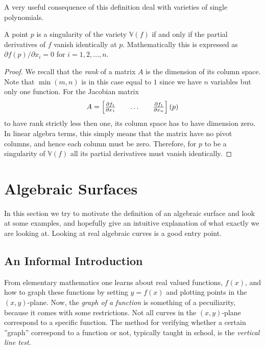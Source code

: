 \documentclass{article}
\newcommand{\V}{\mathbb{V}}
\begin{document}
A very useful consequence of this definition deal with varieties of single
polynomials.
\begin{corollary}
    \label{crl:single_poly}
    A point $p$ is a singularity of the variety $\V(f)$ if and only if the
    partial derivatives of $f$ vanish identically at $p$. Mathematically this
    is expressed as ${\partial f(p)}/{\partial x_i} = 0$ for $i = 1, 2, \ldots,
    n$.
\end{corollary}
\begin{proof}
    We recall that the \emph{rank} of a matrix $A$ is the dimension of its
    column space. Note that $\min(m, n)$ is in this case equal to $1$ since we
    have $n$ variables but only one function.
    For the Jacobian matrix
    \begin{equation}
        \notag
        A = \begin{bmatrix}
            \frac{\partial f_1}{\partial x_1} && \hdots && \frac{\partial f_1}{\partial x_n}
        \end{bmatrix}(p)
    \end{equation} 
    to have rank strictly less then one, its column space has to have dimension
    zero. In linear algebra terms, this simply means that the matrix have no
    pivot columns, and hence each column must be zero. Therefore, for $p$ to be
    a singularity of $\V(f)$ all its partial derivatives must vanish
    identically.
\end{proof}


\section{Algebraic Surfaces}
\label{sec:algebraic_surfaces}

In this section we try to motivate the definition of an algebraic surface and
look at some examples, and hopefully give an intuitive explanation of what
exactly we are looking at. Looking at real algebraic curves is a good entry
point.

\subsection{An Informal Introduction}
\label{sub:an_informal_introduction}

From elementary mathematics one learns about real valued functions, $f(x)$, and
how to graph these functions by setting $y = f(x)$ and plotting points in the
$(x, y)$-plane. Now, the \emph{graph of a function} is something of a
pecuiliarity, because it comes with some restrictions. Not all curves in the
$(x, y)$-plane correspond to a specific function. The method for verifying
whether a certain ''graph'' correspond to a function or not, typically taught
in school, is the \emph{vertical line test}. 
\end{document}
